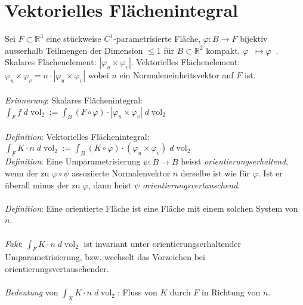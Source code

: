 \documentclass[12pt,a4paper,titlepage]{article}
\newcommand{\setR}{\mathbb{R}}
\newcommand{\vol}{\operatorname{vol}}
\newcommand{\twovec}[2]{\mathop{\left(\substack{#1 \\ #2}\right)}}
\begin{document}
\section*{Vektorielles Flächenintegral}
Sei $F\subset\setR^3$ eine stückweise $C^1$-parametrisierte Fläche, $\varphi:B\to F$ bijektiv ausserhalb Teilmengen der Dimension $\leq 1$ für $B\subset\setR^2$ kompakt. $\varphi\twovec{u}{v}\mapsto\varphi\twovec{u}{v}$. Skalares Flächenelement: $|\varphi_u\times\varphi_v|$. Vektorielles Flächenelement: $\varphi_u\times\varphi_v = n\cdot|\varphi_u\times\varphi_v|$ wobei $n$ ein Normaleneinheitsvektor auf $F$ ist. \\
\\
\textit{Erinnerung}: Skalares Flächenintegral: $\int_Ff\;d\vol_2:=\int_B(F\circ\varphi)\cdot|\varphi_u\times\varphi_v| \;d\vol_2\twovec{u}{v}$ \\
\\
\textit{Definition}: Vektorielles Flächenintegral: $\int_FK\cdot n\;d\vol_2:=\int_B(K\circ\varphi)\cdot(\varphi_u\times\varphi_v) \;d\vol_2\twovec{u}{v}$ \\
\newpage\noindent
\textit{Definition}: Eine Umparametrisierung $\psi:\widetilde{B}\to B$ heisst \emph{orientierungserhaltend}, wenn der zu $\varphi\circ\psi$ assoziierte Normalenvektor $n$ derselbe ist wie für $\varphi$. Ist er überall minus der zu $\varphi$, dann heist $\psi$ \emph{orientierungsvertauschend}. \\
\\
\textit{Definition}: Eine orientierte Fläche ist eine Fläche mit einem solchen System von $n$. \\
\\
\textit{Fakt}: $\int_FK\cdot n \;d\vol_2$ ist invariant unter orientierungserhaltender Umparametrisierung, bzw. wechselt das Vorzeichen bei orientierungsvertauschender. \\
\\
\textit{Bedeutung} von $\int_XK\cdot n\;d\vol_2$: Fluss von $K$ durch $F$ in Richtung von $n$.
\end{document}
